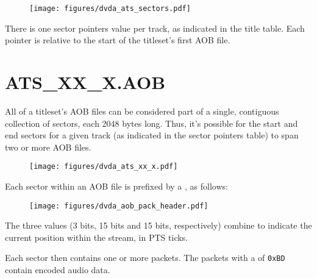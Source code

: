 \begin{figure}[h]
\texttt{[image: figures/dvda\_ats\_sectors.pdf]}
\end{figure}
\par
\noindent
There is one sector pointers value per track,
as indicated in the title table.
Each pointer is relative to the start of the titleset's first
AOB file.

\clearpage

\section{ATS\_XX\_X.AOB}

All of a titleset's AOB files can be considered part of a
single, contiguous collection of sectors, each 2048 bytes long.
Thus, it's possible for the start and end sectors for a given track
(as indicated in the sector pointers table) to span two or more
AOB files.

\begin{figure}[h]
\texttt{[image: figures/dvda\_ats\_xx\_x.pdf]}
\end{figure}
\par
\noindent
Each sector within an AOB file is prefixed by a ,
as follows:
\begin{figure}[h]
\texttt{[image: figures/dvda\_aob\_pack\_header.pdf]}
\end{figure}
\par
\noindent
The three  values (3 bits, 15 bits and 15 bits, respectively)
combine to indicate the current position within the stream, in PTS ticks.
\par
Each sector then contains one or more packets.
The packets with a  of \texttt{0xBD} contain
encoded audio data.

